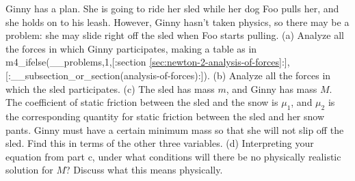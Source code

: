  Ginny has a plan. She is going to ride her sled while
her dog Foo pulls her, and she holds on to his leash.
However, Ginny hasn't taken physics,
so there may be a problem: she may slide right off the sled
when Foo starts pulling.\hwendpart
 (a) Analyze all the forces in which
Ginny participates, making a table as in 
m4_ifelse(__problems,1,[:section \ref{sec:newton-2-analysis-of-forces}:],[:__subsection_or_section(analysis-of-forces):]).\hwendpart
 (b) Analyze all the forces in which the sled participates.\hwendpart
 (c) The sled has mass $m$, and Ginny has mass $M$. The
coefficient of static friction between the sled and the snow
is $\mu_1$, and $\mu_2$ is the corresponding quantity for
static friction between the sled and her snow pants. Ginny
must have a certain minimum mass so that she will not slip
off the sled. Find this in terms of the other three
variables.\answercheck\hwendpart
(d) Interpreting your equation from part c, 
under what conditions will there be no physically realistic solution for $M$? Discuss
what this means physically.
